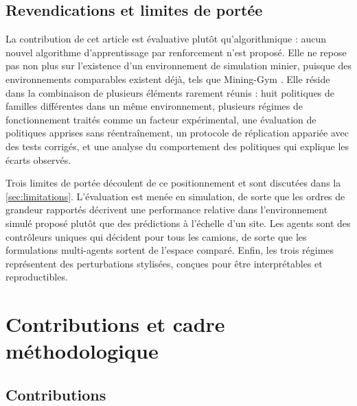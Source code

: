 \documentclass[11pt,a4paper]{article}
\newif\ifrevmarks
\newcommand{\revtag}[1]{\ifrevmarks\textsuperscript{\textcolor{red!70!black}{\scriptsize[#1]}}\fi}
\newenvironment{revbloc}[1]{\par\ifrevmarks\color{revcolor}\noindent\revtag{#1}\ \fi}{\par}
\newcommand{\adir}[1]{\ifrevmarks\textcolor{violet}{\textbf{[À VALIDER AVEC LA DIRECTRICE : #1]}}\fi}
\begin{document}
\subsection{Revendications et limites de portée}

\begin{revbloc}{M26, M27}
La contribution de cet article est évaluative plutôt qu'algorithmique : aucun nouvel algorithme d'apprentissage par renforcement n'est proposé. Elle ne repose pas non plus sur l'existence d'un environnement de simulation minier, puisque des environnements comparables existent déjà, tels que Mining-Gym \cite{Banerjee2025}. Elle réside dans la combinaison de plusieurs éléments rarement réunis : huit politiques de familles différentes dans un même environnement, plusieurs régimes de fonctionnement traités comme un facteur expérimental, une évaluation de politiques apprises sans réentraînement, un protocole de réplication appariée avec des tests corrigés, et une analyse du comportement des politiques qui explique les écarts observés.

Trois limites de portée découlent de ce positionnement et sont discutées dans la \cref{sec:limitations}. L'évaluation est menée en simulation, de sorte que les ordres de grandeur rapportés décrivent une performance relative dans l'environnement simulé proposé plutôt que des prédictions à l'échelle d'un site. Les agents sont des contrôleurs uniques qui décident pour tous les camions, de sorte que les formulations multi-agents \cite{Zhao2025} sortent de l'espace comparé. Enfin, les trois régimes représentent des perturbations stylisées, conçues pour être interprétables et reproductibles.
\end{revbloc}

\adir{vérifier ce que propose exactement Mining-Gym (perturbations, références) et ajuster la colonne correspondante du \cref{tab:litterature} (M26).}


\section{Contributions et cadre méthodologique}
\label{sec:contributions}

\subsection{Contributions}
\end{document}
